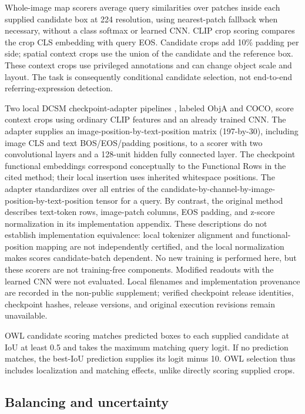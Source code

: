 \documentclass[10pt,twocolumn,letterpaper]{article}
\begin{document}
Whole-image map scorers average query similarities over patches inside
each supplied candidate box at 224 resolution, using nearest-patch
fallback when necessary, without a class softmax or learned CNN. CLIP
crop scoring compares the crop CLS embedding with query EOS. Candidate
crops add 10\% padding per side; spatial context crops use the union of
the candidate and the reference box. These context crops use privileged
annotations and can change object scale and layout. The task is
consequently conditional candidate selection, not end-to-end
referring-expression detection.

Two local DCSM checkpoint-adapter pipelines \citep{kang2025dcsm},
labeled ObjA and COCO, score context crops using ordinary CLIP features
and an already trained CNN. The adapter supplies an
image-position-by-text-position matrix (197-by-30), including image CLS
and text BOS/EOS/padding positions, to a scorer with two convolutional
layers and a 128-unit hidden fully connected layer. The checkpoint
functional embeddings correspond conceptually to the Functional Rows in
the cited method; their local insertion uses inherited whitespace
positions. The adapter standardizes over all entries of the
candidate-by-channel-by-image-position-by-text-position tensor for a
query. By contrast, the original method describes text-token rows,
image-patch columns, EOS padding, and z-score normalization in its
implementation appendix. These descriptions do not establish
implementation equivalence: local tokenizer alignment and
functional-position mapping are not independently certified, and the
local normalization makes scores candidate-batch dependent. No new
training is performed here, but these scorers are not training-free
components. Modified readouts with the learned CNN were not evaluated.
Local filenames and implementation provenance are recorded in the
non-public supplement; verified checkpoint release identities,
checkpoint hashes, release versions, and original execution revisions
remain unavailable.

OWL candidate scoring matches predicted boxes to each supplied candidate
at IoU at least 0.5 and takes the maximum matching query logit. If no
prediction matches, the best-IoU prediction supplies its logit minus 10.
OWL selection thus includes localization and matching effects, unlike
directly scoring supplied crops.

\subsection{Balancing and uncertainty}\label{balancing-and-uncertainty}
\end{document}
